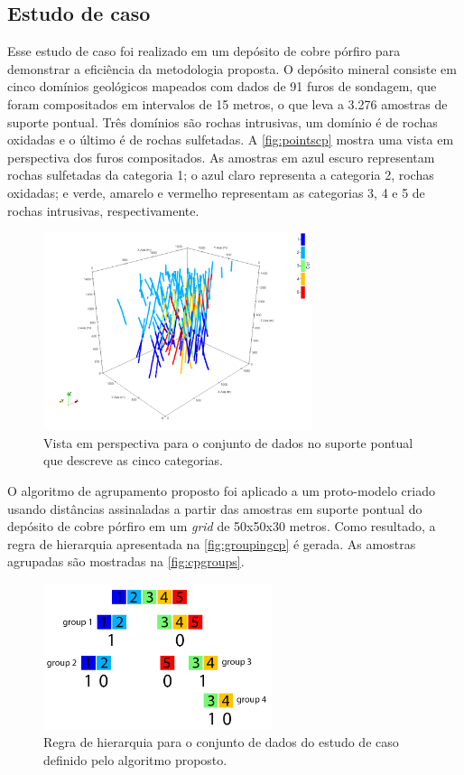 \subsection{Estudo de caso}\label{estudo_cobre}

Esse estudo de caso foi realizado em um depósito de cobre pórfiro para demonstrar a eficiência da metodologia proposta. O depósito mineral consiste em cinco domínios geológicos mapeados com dados de 91 furos de sondagem, que foram compositados em intervalos de 15 metros, o que leva a 3.276 amostras de suporte pontual. Três domínios são rochas intrusivas, um domínio é de rochas oxidadas e o último é de rochas sulfetadas. A \autoref{fig:pointscp} mostra uma vista em perspectiva dos furos compositados. As amostras em azul escuro representam rochas sulfetadas da categoria 1; o azul claro representa a categoria 2, rochas oxidadas; e verde, amarelo e vermelho representam as categorias 3, 4 e 5 de rochas intrusivas, respectivamente.

\begin{figure}[H]
\centering
\caption{Vista em perspectiva para o conjunto de dados no suporte pontual que descreve as cinco categorias.}
\label{fig:pointscp}
\includegraphics[width=0.7\textwidth]{capitulo_3/imagens/pointscp.png}
\end{figure}

O algoritmo de agrupamento proposto foi aplicado a um proto-modelo criado usando distâncias assinaladas a partir das amostras em suporte pontual do depósito de cobre pórfiro em um \textit{grid} de 50x50x30 metros. Como resultado, a regra de hierarquia apresentada na \autoref{fig:groupingcp} é gerada. As amostras agrupadas são mostradas na \autoref{fig:cpgroups}.

\begin{figure}[H]
\caption{Regra de hierarquia para o conjunto de dados do estudo de caso definido pelo algoritmo proposto.}
\label{fig:groupingcp}
\centering
\includegraphics[width=0.6\textwidth]{capitulo_3/imagens/groupingcp.png}
\end{figure}

